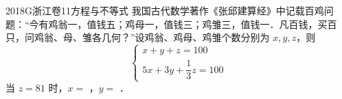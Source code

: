 
\begin{problem}{2018}{G}{浙江卷}{11}{方程与不等式}
我国古代数学著作《张邱建算经》中记载百鸡问题：“今有鸡翁一，值钱五；鸡母一，值钱三；鸡雏三，值钱一．凡百钱，买百只，问鸡翁、母、雏各几何？”设鸡翁、鸡母、鸡雏个数分别为 $ x,y,z $，则
\[
\begin{cases}
x+y+z=100\\
5x+3y+\dfrac{1}{3}z=100
\end{cases}
\]
当 $ z=81 $ 时，$ x= $ \underline{\hspace{4em}}，$ y= $ \underline{\hspace{4em}}．
\end{problem}

\begin{answer}

\end{answer}

\begin{solutions}

\end{solutions}